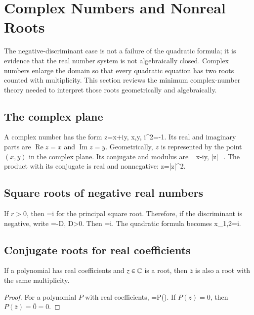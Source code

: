 \section{Complex Numbers and Nonreal Roots}

The negative-discriminant case is not a failure of the quadratic formula; it is evidence that the real number system is not algebraically closed. Complex numbers enlarge the domain so that every quadratic equation has two roots counted with multiplicity. This section reviews the minimum complex-number theory needed to interpret those roots geometrically and algebraically.

\subsection{The complex plane}

A complex number has the form
\be
z=x+iy,
\qquad x,y\in\R,
\qquad i^2=-1.
\ee
Its real and imaginary parts are $\operatorname{Re}z=x$ and $\operatorname{Im}z=y$. Geometrically, $z$ is represented by the point $(x,y)$ in the complex plane. Its conjugate and modulus are
\be
{}=x-iy,
\qquad
|z|=.
\ee
The product with its conjugate is real and nonnegative:
\be
z=|z|^2.
\ee

\subsection{Square roots of negative real numbers}

If $r>0$, then
\be
{}=i
\ee
for the principal square root. Therefore, if the discriminant is negative, write
\be
\Delta=-D,
\qquad D>0.
\ee
Then
\be
\sqrt{\Delta}=i.
\ee
The quadratic formula becomes
\be
x_{1,2}=\pm i.
\ee

\subsection{Conjugate roots for real coefficients}

\begin{theorem}
If a polynomial has real coefficients and $z\in\mathbb{C}$ is a root, then $\overline{z}$ is also a root with the same multiplicity.
\end{theorem}

\begin{proof}
For a polynomial $P$ with real coefficients,
\be
{}=P().
\ee
If $P(z)=0$, then $P(\overline{z})=\overline{0}=0$.
\end{proof}

